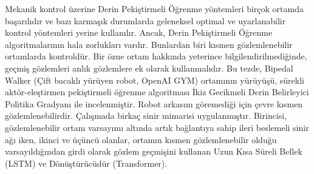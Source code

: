 Mekanik kontrol üzerine Derin Pekiştirmeli Öğrenme yöntemleri birçok ortamda başarılıdır ve bazı karmaşık durumlarda geleneksel optimal ve uyarlanabilir kontrol yöntemleri yerine kullanılır. Ancak, Derin Pekiştirmeli Öğrenme algoritmalarının hala zorlukları vardır. Bunlardan biri kısmen gözlemlenebilir ortamlarda kontroldür. Bir özne ortam hakkında yeterince bilgilendirilmediğinde, geçmiş gözlemleri anlık gözlemlere ek olarak kullanmalıdır. Bu tezde, Bipedal Walker (Çift bacaklı yürüyen robot, OpenAI GYM) ortamının yürüyüşü, sürekli aktör-eleştirmen pekiştirmeli öğrenme algoritması İkiz Gecikmeli Derin Belirleyici Politika Gradyanı ile incelenmiştir. Robot arkasını göremediği için çevre kısmen gözlemlenebilirdir. Çalışmada birkaç sinir mimarisi uygulanmıştır. Birincisi, gözlemlenebilir ortam varsayımı altında artık bağlantıya sahip ileri beslemeli sinir ağı iken, ikinci ve üçüncü olanlar, ortamın kısmen gözlemlenebilir olduğu varsayıldığından girdi olarak gözlem geçmişini kullanan Uzun Kısa Süreli Bellek (LSTM) ve Dönüştürücüdür (Transformer).